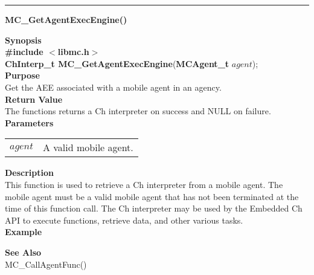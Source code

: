 \noindent
\vspace{5pt}
\rule{6.5in}{0.015in}
\noindent
{\LARGE \bf MC\_GetAgentExecEngine()}\\
{}

\noindent
{\bf Synopsis}\\
{\bf \#include $<$libmc.h$>$}\\
{\bf ChInterp\_t MC\_GetAgentExecEngine}({\bf MCAgent\_t} $agent$);\\

\noindent
{\bf Purpose}\\
Get the AEE associated with a mobile agent in an agency.\\

\noindent
{\bf Return Value}\\
The functions returns a Ch interpreter on success and NULL on failure.\\

\noindent
{\bf Parameters}
\vspace{-0.1in}
\begin{description}
\item               
\begin{tabular}{p{10 mm}p{145 mm}}
$agent$ & A valid mobile agent.
\end{tabular}
\end{description}

\noindent
{\bf Description}\\
This function is used to retrieve a Ch interpreter from a mobile agent. 
The mobile agent must be a valid mobile agent that has not been terminated 
at the time of this function call. 
The Ch interpreter may be used by the Embedded Ch API to execute functions, 
retrieve data, and other various tasks.\\

\noindent
{\bf Example}\\
\noindent
{\footnotesize}

\noindent
{\bf See Also}\\
MC\_CallAgentFunc()

